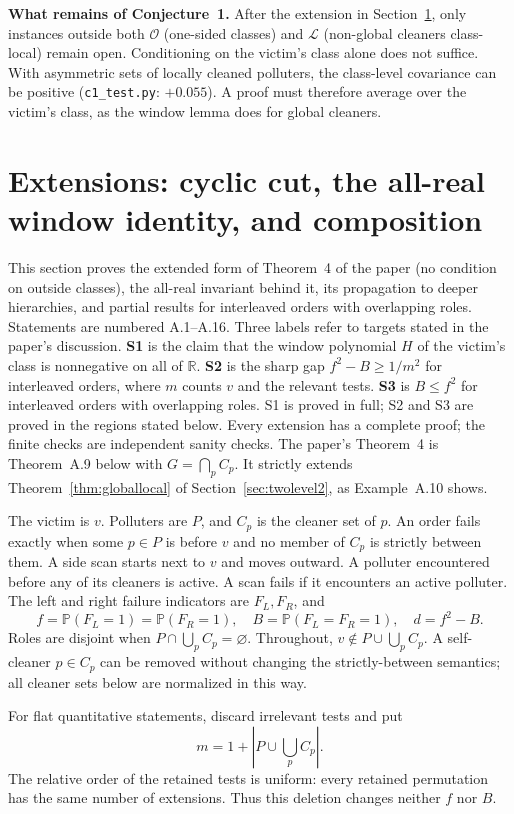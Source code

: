 \documentclass[11pt,a4paper]{article}
\theoremstyle{definition}\newtheorem{definition}[theorem]{Definition}
\theoremstyle{remark}\newtheorem{remark}[theorem]{Remark}
\theoremstyle{definition}\newtheorem{xexample}[xtheorem]{Example}\theoremstyle{plain}
\newcommand{\PP}{\mathbb P}\newcommand{\EE}{\mathbb E}\newcommand{\Cov}{\operatorname{Cov}}
\begin{document}
\textbf{What remains of Conjecture~1.} After the extension in Section~\ref{sec:extensions}, only instances outside both $\mathcal O$ (one-sided classes) and $\mathcal L$ (non-global cleaners class-local) remain open. Conditioning on the victim's class alone does not suffice. With asymmetric sets of locally cleaned polluters, the class-level covariance can be positive (\texttt{c1\_test.py}: $+0.055$). A proof must therefore average over the victim's class, as the window lemma does for global cleaners.

\section{Extensions: cyclic cut, the all-real window identity, and composition}\label{sec:extensions}
This section proves the extended form of Theorem~4 of the paper (no condition on outside classes), the all-real invariant behind it, its propagation to deeper hierarchies, and partial results for interleaved orders with overlapping roles. Statements are numbered A.1--A.16. Three labels refer to targets stated in the paper's discussion. \textbf{S1} is the claim that the window polynomial $H$ of the victim's class is nonnegative on all of $\mathbb R$. \textbf{S2} is the sharp gap $f^2-B\ge1/m^2$ for interleaved orders, where $m$ counts $v$ and the relevant tests. \textbf{S3} is $B\le f^2$ for interleaved orders with overlapping roles. S1 is proved in full; S2 and S3 are proved in the regions stated below. Every extension has a complete proof; the finite checks are independent sanity checks. The paper's Theorem~4 is Theorem~A.9 below with $G=\bigcap_pC_p$. It strictly extends Theorem~\ref{thm:globallocal} of Section~\ref{sec:twolevel2}, as Example~A.10 shows.

The victim is $v$. Polluters are $P$, and $C_p$ is the cleaner set of $p$. An order fails exactly when some $p\in P$ is before $v$ and no member of $C_p$ is strictly between them. A side scan starts next to $v$ and moves outward. A polluter encountered before any of its cleaners is active. A scan fails if it encounters an active polluter. The left and right failure indicators are $F_L,F_R$, and
\[
f=\PP(F_L=1)=\PP(F_R=1),\quad B=\PP(F_L=F_R=1),\quad d=f^2-B.
\]
Roles are disjoint when $P\cap\bigcup_p C_p=\varnothing$. Throughout, $v\notin P\cup\bigcup_p C_p$. A self-cleaner $p\in C_p$ can be removed without changing the strictly-between semantics; all cleaner sets below are normalized in this way.

For flat quantitative statements, discard irrelevant tests and put
\[
m=1+\left|P\cup\bigcup_p C_p\right|.
\]
The relative order of the retained tests is uniform: every retained permutation has the same number of extensions. Thus this deletion changes neither $f$ nor $B$.
\end{document}

